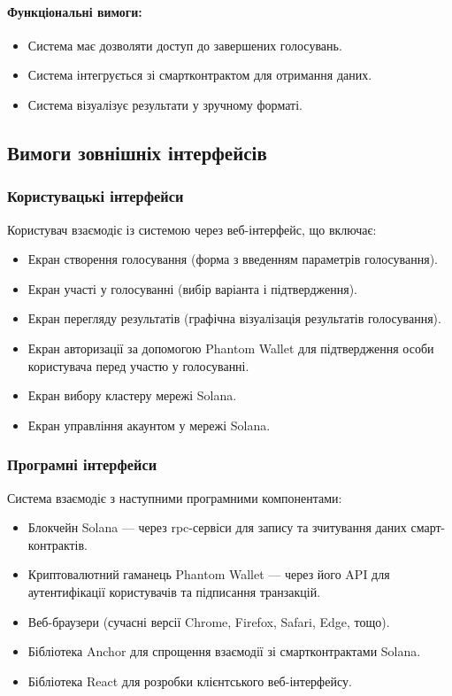 \documentclass[14pt]{extreport}
\newcounter{req}[subsubsection]
\newcommand\req{\arabic{req}\stepcounter{req}}
\begin{document}
  \paragraph{Функціональні вимоги:}  
  \begin{itemize}[leftmargin=*,label=REQ-.\req:]  
      \item Система має дозволяти доступ до завершених голосувань.  
      \item Система інтегрується зі смартконтрактом для отримання даних.  
      \item Система візуалізує результати у зручному форматі.
  \end{itemize}  

  \subsection{Вимоги зовнішніх інтерфейсів}
  \subsubsection{Користувацькі інтерфейси}
  Користувач взаємодіє із системою через веб-інтерфейс, що включає:
  \begin{itemize}
    \item Екран створення голосування (форма з введенням параметрів голосування).
    \item Екран участі у голосуванні (вибір варіанта і підтвердження).
    \item Екран перегляду результатів (графічна візуалізація результатів голосування).
    \item Екран авторизації за допомогою Phantom Wallet для підтвердження особи користувача перед участю у голосуванні.
    \item Екран вибору кластеру мережі Solana.
    \item Екран управління акаунтом у мережі Solana.
  \end{itemize}
  
  \subsubsection{Програмні інтерфейси}
  Система взаємодіє з наступними програмними компонентами:
  \begin{itemize}
    \item Блокчейн Solana — через \gls{rpc}-сервіси для запису та зчитування даних смарт-контрактів.
    \item Криптовалютний гаманець Phantom Wallet — через його API для аутентифікації користувачів та підписання транзакцій.
    \item Веб-браузери (сучасні версії Chrome, Firefox, Safari, Edge, тощо).
    \item Бібліотека Anchor для спрощення взаємодії зі смартконтрактами Solana.
    \item Бібліотека React для розробки клієнтського веб-інтерфейсу.
  \end{itemize}
  
\end{document}
